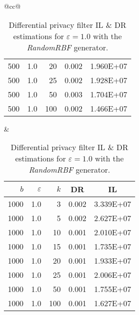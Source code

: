 \begin{table}[H]
\begin{tabular}{@{}cc@{}}
\begin{tabular}{@{}rrrrr@{}}
			500 & 1.0 & 20  & 0.002 & 1.960E+07 \\
			500 & 1.0 & 25  & 0.002 & 1.928E+07 \\
			500 & 1.0 & 50  & 0.003 & 1.704E+07 \\
			500 & 1.0 & 100 & 0.002 & 1.466E+07 \\ \bottomrule
		\end{tabular}
		&
		\begin{tabular}{@{}rrrrr@{}}
			\toprule
			$b$ & $\varepsilon$ & $k$ & \multicolumn{1}{c}{DR} & \multicolumn{1}{c}{IL} \\ \midrule
			1000 & 1.0 & 3   & 0.002 & 3.339E+07 \\
			1000 & 1.0 & 5   & 0.002 & 2.627E+07 \\
			1000 & 1.0 & 10  & 0.001 & 2.010E+07 \\
			1000 & 1.0 & 15  & 0.001 & 1.735E+07 \\
			1000 & 1.0 & 20  & 0.001 & 1.933E+07 \\
			1000 & 1.0 & 25  & 0.001 & 2.006E+07 \\
			1000 & 1.0 & 50  & 0.001 & 1.755E+07 \\
			1000 & 1.0 & 100 & 0.001 & 1.627E+07 \\ \bottomrule
		\end{tabular}
	\end{tabular}
	\caption[Differential privacy filter DR \& IL estimations (RandomRBF), $\varepsilon = 1.0$.]{Differential privacy filter IL \& DR estimations for $\varepsilon = 1.0$ with the \textit{RandomRBF} generator.}
	\label{table:results-rbf-diff-priv-e1.0}
\end{table}

